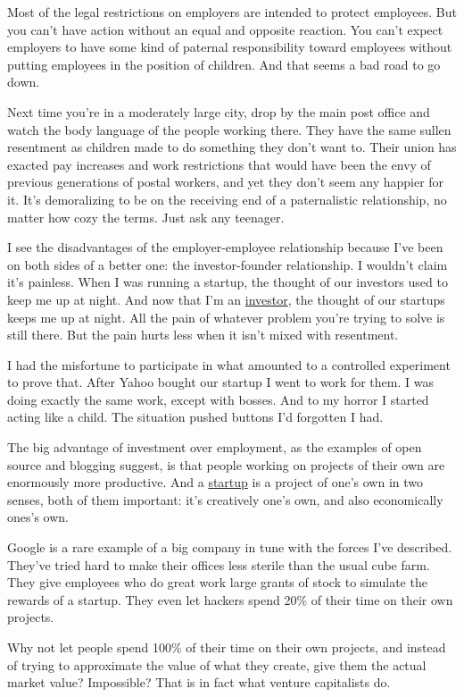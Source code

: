 Most of the legal restrictions on employers are intended to protect
employees. But you can't have action without an equal and opposite
reaction. You can't expect employers to have some kind of paternal
responsibility toward employees without putting employees in the
position of children. And that seems a bad road to go down.

Next time you're in a moderately large city, drop by the main post
office and watch the body language of the people working there. They
have the same sullen resentment as children made to do something they
don't want to. Their union has exacted pay increases and work
restrictions that would have been the envy of previous generations of
postal workers, and yet they don't seem any happier for it. It's
demoralizing to be on the receiving end of a paternalistic relationship,
no matter how cozy the terms. Just ask any teenager.

I see the disadvantages of the employer-employee relationship because
I've been on both sides of a better one: the investor-founder
relationship. I wouldn't claim it's painless. When I was running a
startup, the thought of our investors used to keep me up at night. And
now that I'm an \href{http://ycombinator.com}{investor}, the thought of
our startups keeps me up at night. All the pain of whatever problem
you're trying to solve is still there. But the pain hurts less when it
isn't mixed with resentment.

I had the misfortune to participate in what amounted to a controlled
experiment to prove that. After Yahoo bought our startup I went to work
for them. I was doing exactly the same work, except with bosses. And to
my horror I started acting like a child. The situation pushed buttons
I'd forgotten I had.

The big advantage of investment over employment, as the examples of open
source and blogging suggest, is that people working on projects of their
own are enormously more productive. And a \href{start.html}{startup} is
a project of one's own in two senses, both of them important: it's
creatively one's own, and also economically ones's own.

Google is a rare example of a big company in tune with the forces I've
described. They've tried hard to make their offices less sterile than
the usual cube farm. They give employees who do great work large grants
of stock to simulate the rewards of a startup. They even let hackers
spend 20\% of their time on their own projects.

Why not let people spend 100\% of their time on their own projects, and
instead of trying to approximate the value of what they create, give
them the actual market value? Impossible? That is in fact what venture
capitalists do.

